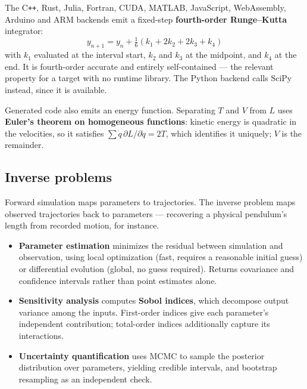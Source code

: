 \documentclass[11pt,a4paper]{article}
\begin{document}
The C\texttt{++}, Rust, Julia, Fortran, CUDA, MATLAB, JavaScript, WebAssembly, Arduino and ARM
backends emit a fixed-step \textbf{fourth-order Runge--Kutta} integrator:
\begin{equation}
y_{n+1} = y_n + \tfrac{1}{6}\left(k_1 + 2k_2 + 2k_3 + k_4\right)
\end{equation}
with $k_1$ evaluated at the interval start, $k_2$ and $k_3$ at the midpoint, and $k_4$ at the end. It
is fourth-order accurate and entirely self-contained --- the relevant property for a target with no
runtime library. The Python backend calls SciPy instead, since it is available.

Generated code also emits an energy function. Separating $T$ and $V$ from $L$ uses \textbf{Euler's
theorem on homogeneous functions}: kinetic energy is quadratic in the velocities, so it satisfies
$\sum \dot q\,\partial L/\partial \dot q = 2T$, which identifies it uniquely; $V$ is the remainder.

\subsection{Inverse problems}

Forward simulation maps parameters to trajectories. The inverse problem maps observed trajectories
back to parameters --- recovering a physical pendulum's length from recorded motion, for instance.

\begin{itemize}[leftmargin=1.4em,itemsep=0.3em]
  \item \textbf{Parameter estimation} minimizes the residual between simulation and observation,
        using local optimization (fast, requires a reasonable initial guess) or differential
        evolution (global, no guess required). Returns covariance and confidence intervals rather
        than point estimates alone.
  \item \textbf{Sensitivity analysis} computes \textbf{Sobol indices}, which decompose output
        variance among the inputs. First-order indices give each parameter's independent
        contribution; total-order indices additionally capture its interactions.
  \item \textbf{Uncertainty quantification} uses MCMC to sample the posterior distribution over
        parameters, yielding credible intervals, and bootstrap resampling as an independent check.
\end{itemize}

\end{document}
